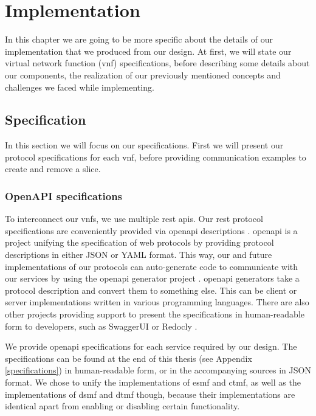 \chapter{Implementation}
\label{implementation}

In this chapter we are going to be more specific about the details of our implementation that we produced from our design. At first, we will state our virtual network function (\acrshort{vnf}) specifications, before describing some details about our components, the realization of our previously mentioned concepts and challenges we faced while implementing.


\section{Specification}
\label{impl_specification}
In this section we will focus on our specifications. First we will present our protocol specifications for each \acrshort{vnf}, before providing communication examples to create and remove a slice.

\subsection{OpenAPI specifications}
To interconnect our \acrshort{vnf}s, we use multiple \acrshort{rest} \acrshort{api}s. Our \acrshort{rest} protocol specifications are conveniently provided via \Gls{openapi} descriptions \cite{openapi}. \Gls{openapi} is a project unifying the specification of web protocols by providing protocol descriptions in either JSON or YAML format. This way, our and future implementations of our protocols can auto-generate code to communicate with our services by using the \Gls{openapi} generator project \cite{openapi-generator}. \Gls{openapi} generators take a protocol description and convert them to something else. This can be client or server implementations written in various programming languages. There are also other projects providing support to present the specifications in human-readable form to developers, such as SwaggerUI \cite{swaggerui} or Redocly \cite{redocly}.

We provide \Gls{openapi} specifications for each service required by our design. The specifications can be found at the end of this thesis (see Appendix \ref{specifications}) in human-readable form, or in the accompanying sources in JSON format. We chose to unify the implementations of \acrshort{esmf} and \acrshort{ctmf}, as well as the implementations of \acrshort{dsmf} and \acrshort{dtmf} though, because their implementations are identical apart from enabling or disabling certain functionality.

